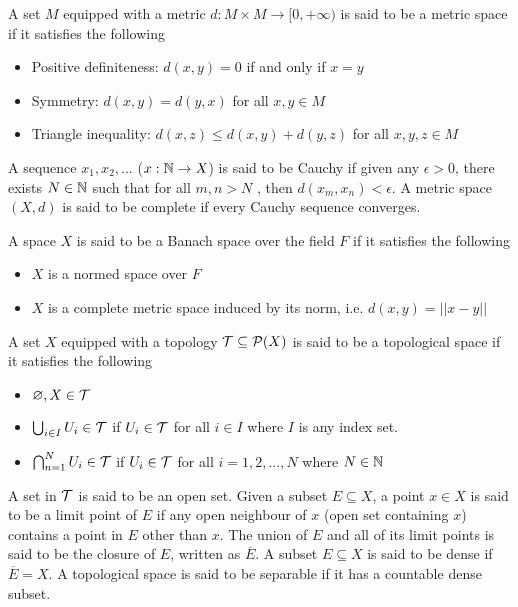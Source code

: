 \documentclass{report}
\begin{document}
\begin{definition}
    A set $M$ equipped with a metric $d: M \times M \to [0, +\infty)$ is said to be a metric space if it satisfies the following
    \begin{itemize}
        \item Positive definiteness: $d(x, y) = 0$ if and only if $x = y$
        \item Symmetry: $d(x, y) = d(y, x)$ for all $x, y \in M$
        \item Triangle inequality: $d(x, z) \leq d(x, y) + d(y, z)$ for all $x, y, z \in M$
    \end{itemize}
    A sequence $x_1, x_2, ...$ ($x: \mathbb{N} \to X$) is said to be Cauchy if given any $\epsilon > 0$, there exists $N \in \mathbb{N}$ such that for all $m, n > N$ , then $d(x_m, x_n) < \epsilon$. A metric space $(X, d)$ is said to be complete if every Cauchy sequence converges.
\end{definition}

\begin{definition}
    A space $X$ is said to be a Banach space over the field $F$ if it satisfies the following
    \begin{itemize}
        \item $X$ is a normed space over $F$
        \item $X$ is a complete metric space induced by its norm, i.e. $d(x, y) = ||x-y||$
    \end{itemize}
\end{definition}

\begin{definition}
    A set $X$ equipped with a topology $\mathcal{T} \subseteq \mathcal{P}(X)$ is said to be a topological space if it satisfies the following
    \begin{itemize}
        \item $\varnothing, X \in \mathcal{T}$
        \item $\bigcup_{i \in I} U_i \in \mathcal{T}$ if $U_i \in \mathcal{T}$ for all $i \in I$ where $I$ is any index set.
        \item $\bigcap_{n=1}^N U_i \in \mathcal{T}$ if $U_i \in \mathcal{T}$ for all $i = 1, 2, ..., N$ where $N \in \mathbb{N}$
    \end{itemize}
    A set in $\mathcal{T}$ is said to be an open set. Given a subset $E \subseteq X$, a point $x \in X$ is said to be a limit point of $E$ if any open neighbour of $x$ (open set containing $x$) contains a point in $E$ other than $x$. The union of $E$ and all of its limit points is said to be the closure of $E$, written as $\overline{E}$. A subset $E \subseteq X$ is said to be dense if $\overline{E} = X$. A topological space is said to be separable if it has a countable dense subset.
\end{definition}
\end{document}
